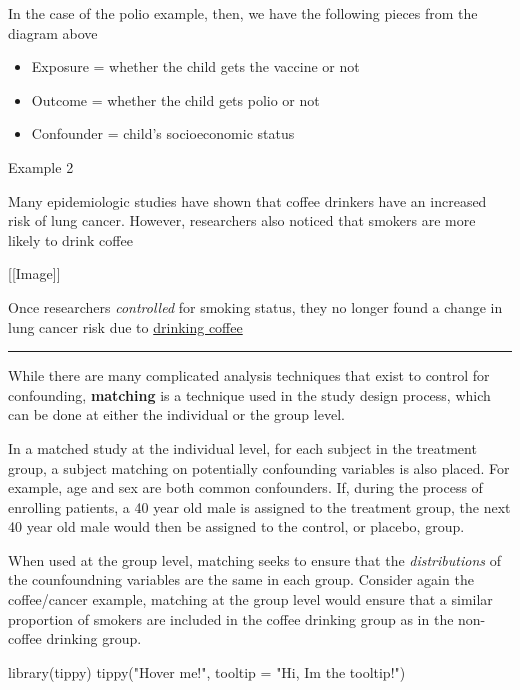 \documentclass[
]{book}
\newenvironment{Shaded}{\begin{snugshade}}{\end{snugshade}}
\newcommand{\AttributeTok}[1]{\textcolor[rgb]{0.77,0.63,0.00}{#1}}
\newcommand{\FunctionTok}[1]{\textcolor[rgb]{0.00,0.00,0.00}{#1}}
\newcommand{\NormalTok}[1]{#1}
\newcommand{\StringTok}[1]{\textcolor[rgb]{0.31,0.60,0.02}{#1}}
\providecommand{\tightlist}{%
  \setlength{\itemsep}{0pt}\setlength{\parskip}{0pt}}
\theoremstyle{definition}
\theoremstyle{definition}
\theoremstyle{definition}
\theoremstyle{remark}
\begin{document}
In the case of the polio example, then, we have the following pieces from the diagram above

\begin{itemize}
\tightlist
\item
  Exposure = whether the child gets the vaccine or not
\item
  Outcome = whether the child gets polio or not
\item
  Confounder = child's socioeconomic status
\end{itemize}

Example 2

Many epidemiologic studies have shown that coffee drinkers have an increased risk of lung cancer. However, researchers also noticed that smokers are more likely to drink coffee

{[}{[}Image{]}{]}

Once researchers \emph{controlled} for smoking status, they no longer found a change in lung cancer risk due to \href{https://cebp.aacrjournals.org/content/25/6/951}{drinking coffee}

\begin{center}\rule{0.5\linewidth}{0.5pt}\end{center}

While there are many complicated analysis techniques that exist to control for confounding, \textbf{matching} is a technique used in the study design process, which can be done at either the individual or the group level.

In a matched study at the individual level, for each subject in the treatment group, a subject matching on potentially confounding variables is also placed. For example, age and sex are both common confounders. If, during the process of enrolling patients, a 40 year old male is assigned to the treatment group, the next 40 year old male would then be assigned to the control, or placebo, group.

When used at the group level, matching seeks to ensure that the \emph{distributions} of the counfoundning variables are the same in each group. Consider again the coffee/cancer example, matching at the group level would ensure that a similar proportion of smokers are included in the coffee drinking group as in the non-coffee drinking group.

\begin{Shaded}
\begin{Highlighting}[]
\FunctionTok{library}\NormalTok{(tippy)}
\FunctionTok{tippy}\NormalTok{(}\StringTok{"Hover me!"}\NormalTok{, }\AttributeTok{tooltip =} \StringTok{"Hi, I\textquotesingle{}m the tooltip!"}\NormalTok{)}
\end{Highlighting}
\end{Shaded}
\end{document}
